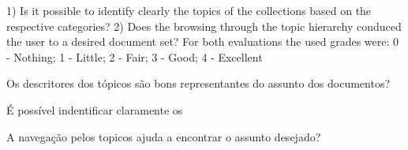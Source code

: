 1) Is it possible to identify clearly the topics of the collections
based on the respective categories?
2) Does the browsing through the topic hierarchy conduced
the user to a desired document set?
For both evaluations the used grades were:
0 - Nothing;
1 - Little;
2 - Fair;
3 - Good;
4 - Excellent


\item Os descritores dos tópicos são bons representantes do assunto dos documentos?
\item É possível indentificar claramente os 
\item A navegação pelos topicos ajuda a encontrar o assunto desejado?







%

%


